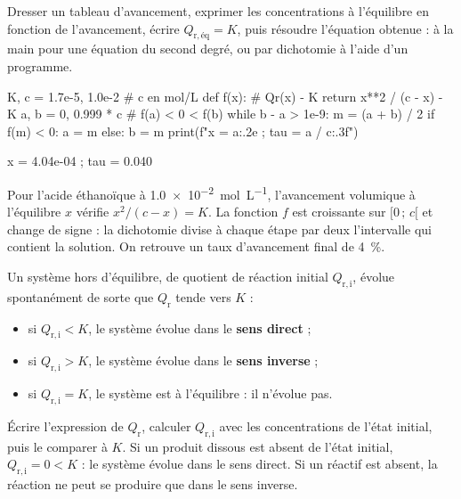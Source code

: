 \begin{savoirfaire}
Dresser un tableau d'avancement, exprimer les concentrations à l'équilibre en fonction de l'avancement, écrire
$Q_{\mathrm{r},\text{éq}}=K$, puis résoudre l'équation obtenue : à la main pour une équation du second degré, ou par
dichotomie à l'aide d'un programme.
\end{savoirfaire}
\begin{codecote}[0.56]
\begin{pythoncol}
K, c = 1.7e-5, 1.0e-2   # c en mol/L
def f(x):               # Qr(x) - K
    return x**2 / (c - x) - K
a, b = 0, 0.999 * c     # f(a) < 0 < f(b)
while b - a > 1e-9:
    m = (a + b) / 2
    if f(m) < 0:
        a = m
    else:
        b = m
print(f"x = {a:.2e} ; tau = {a / c:.3f}")
\end{pythoncol}
\begin{consolecol}
x = 4.04e-04 ; tau = 0.040
\end{consolecol}
\cote
\fontsize{9.5}{12.5}\selectfont
{}\par\smallskip
Pour l'acide éthanoïque à \qty{1,0e-2}{mol.L^{-1}}, l'avancement volumique à l'équilibre $x$ vérifie
$x^2/(c-x)=K$. La fonction $f$ est croissante sur $[0\,;\,c[$ et change de signe : la dichotomie divise à chaque
étape par deux l'intervalle qui contient la solution. On retrouve un taux d'avancement final de 4~\%.
\end{codecote}
\begin{theoreme}
Un système hors d'équilibre, de quotient de réaction initial $Q_{\mathrm{r},\mathrm{i}}$, évolue spontanément de sorte que
$Q_\mathrm{r}$ tende vers $K$ :
\begin{itemize}[leftmargin=1.4em,itemsep=0.1em]
\item si $Q_{\mathrm{r},\mathrm{i}}<K$, le système évolue dans le \textbf{sens direct} ;
\item si $Q_{\mathrm{r},\mathrm{i}}>K$, le système évolue dans le \textbf{sens inverse} ;
\item si $Q_{\mathrm{r},\mathrm{i}}=K$, le système est à l'équilibre : il n'évolue pas.
\end{itemize}
\end{theoreme}
\begin{savoirfaire}
Écrire l'expression de $Q_\mathrm{r}$, calculer $Q_{\mathrm{r},\mathrm{i}}$ avec les concentrations de l'état initial, puis le
comparer à $K$. Si un produit dissous est absent de l'état initial, $Q_{\mathrm{r},\mathrm{i}}=0<K$ : le système évolue dans le
sens direct. Si un réactif est absent, la réaction ne peut se produire que dans le sens inverse.
\end{savoirfaire}
